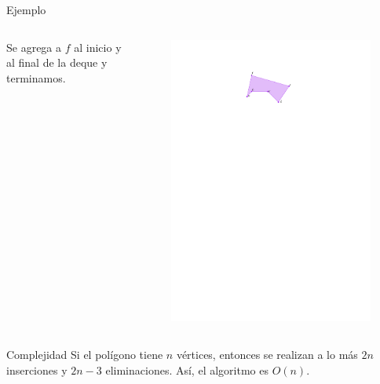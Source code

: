 \documentclass[aspectratio=169,xcolor=dvipsnames, t]{beamer}
\begin{document}
\begin{frame}{Ejemplo}
  \begin{columns}
    \begin{column}{0.5\textwidth}
      Se agrega a $f$ al inicio y al final de la deque y terminamos.
    \end{column}
    \begin{column}{0.5\textwidth}
      \begin{figure}
        \centering
        \includegraphics[width=\linewidth, height=0.5\textheight, page=13, keepaspectratio]{IPE/Melkman.pdf}
      \end{figure}
    \end{column}
  \end{columns}
\end{frame}
\begin{frame}{Complejidad}
  Si el polígono tiene $n$ vértices, entonces se realizan a lo más $2n$ inserciones y $2n-3$ eliminaciones. Así, el algoritmo es $O(n)$.
\end{frame}
\end{document}

